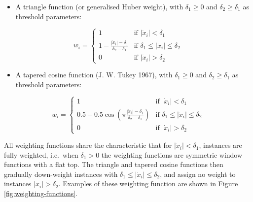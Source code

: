 \documentclass[
  a4paper,
]{article}
\providecommand{\tightlist}{%
  \setlength{\itemsep}{0pt}\setlength{\parskip}{0pt}}
\begin{document}
\begin{itemize}
\tightlist
\item
  A triangle function (or generalised Huber weight), with
  \(\delta_1 \geq 0\) and \(\delta_2 \geq \delta_1\) as threshold
  parameters:
\end{itemize}

\begin{equation}
w_i =
\begin{cases}
1 & \text{if } \left| \dot{x}_i \right| < \delta_1\\
1 - \frac{\left| \dot{x}_i \right| - \delta_1}{\delta_2 - \delta_1} & \text{if } \delta_1 \leq \left| \dot{x}_i \right| \leq \delta_2 \\
0 & \text{if } \left| \dot{x}_i \right| > \delta_2
\end{cases}
\end{equation}

\begin{itemize}
\tightlist
\item
  A tapered cosine function (J. W. Tukey 1967), with \(\delta_1 \geq 0\)
  and \(\delta_2 \geq \delta_1\) as threshold parameters:
\end{itemize}

\begin{equation}
w_i =
\begin{cases}
1 & \text{if } \left| \dot{x}_i \right| < \delta_1\\
0.5 + 0.5 \cos\left(\pi \frac{\left| \dot{x}_i \right| - \delta_1}{\delta_2 - \delta_1} \right) & \text{if } \delta_1 \leq \left| \dot{x}_i \right| \leq \delta_2 \\
0 & \text{if } \left| \dot{x}_i \right| > \delta_2
\end{cases}
\end{equation}

All weighting functions share the characteristic that for
\(\left| \dot{x}_i \right|< \delta_1\), instances are fully weighted,
i.e.~when \(\delta_1 > 0\) the weighting functions are symmetric window
functions with a flat top. The triangle and tapered cosine functions
then gradually down-weight instances with
\(\delta_1 \leq \left| \dot{x}_i \right| \leq \delta_2\), and assign no
weight to instances \(\left| x_i \right| > \delta_2\). Examples of these
weighting function are shown in Figure \ref{fig:weighting-functions}.
\end{document}

